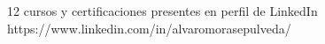 


\begin{cventries}

  \cventry
    {12 cursos y certificaciones presentes en perfil de LinkedIn \newline
    https://www.linkedin.com/in/alvaromorasepulveda/} %
    {} %
    {} %
    {} %
    {}

\end{cventries}
